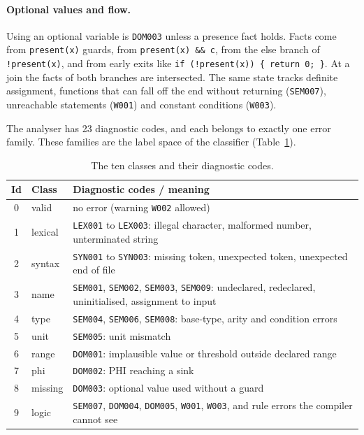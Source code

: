 \documentclass[12pt,a4paper]{article}
\newcommand{\code}[1]{\texttt{#1}}
\begin{document}
\paragraph{Optional values and flow.} Using an optional variable is \code{DOM003} unless a presence fact holds. Facts
come from \code{present(x)} guards, from \code{present(x) \&\& c}, from the else branch of \code{!present(x)}, and from
early exits like \code{if (!present(x)) \{ return 0; \}}. At a join the facts of both branches are intersected. The
same state tracks definite assignment, functions that can fall off the end without returning (\code{SEM007}),
unreachable statements (\code{W001}) and constant conditions (\code{W003}).

The analyser has 23 diagnostic codes, and each belongs to exactly one error family. These families are the label space
of the classifier (Table~\ref{tab:families}).

\begin{table}[!htbp]
\centering
\caption{The ten classes and their diagnostic codes.}
\label{tab:families}
\small
\begin{tabular}{clp{9.6cm}}
\toprule
\textbf{Id} & \textbf{Class} & \textbf{Diagnostic codes / meaning}\\
\midrule
0 & valid & no error (warning \code{W002} allowed)\\
1 & lexical & \code{LEX001} to \code{LEX003}: illegal character, malformed number, unterminated string\\
2 & syntax & \code{SYN001} to \code{SYN003}: missing token, unexpected token, unexpected end of file\\
3 & name & \code{SEM001}, \code{SEM002}, \code{SEM003}, \code{SEM009}: undeclared, redeclared, uninitialised, assignment to input\\
4 & type & \code{SEM004}, \code{SEM006}, \code{SEM008}: base-type, arity and condition errors\\
5 & unit & \code{SEM005}: unit mismatch\\
6 & range & \code{DOM001}: implausible value or threshold outside declared range\\
7 & phi & \code{DOM002}: PHI reaching a sink\\
8 & missing & \code{DOM003}: optional value used without a guard\\
9 & logic & \code{SEM007}, \code{DOM004}, \code{DOM005}, \code{W001}, \code{W003}, and rule errors the compiler cannot see\\
\bottomrule
\end{tabular}
\end{table}
\end{document}
